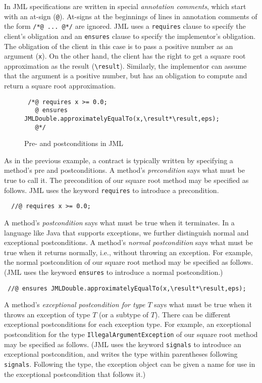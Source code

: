 \documentclass{jotarticle}
\begin{document}
In JML specifications are written in special \emph{annotation
comments\/}, which start with an at-sign (\texttt{@}).
At-signs at the beginnings of lines in annotation comments of the form
\texttt{/*@ ... @*/} are ignored.
JML uses a \texttt{requires} clause to specify the
client's obligation and an \texttt{ensures} clause to specify the
implementor's obligation.  The obligation of the client in this case is
to pass a positive number as an argument (\texttt{x}). On the other
hand, the client has the right to get a square root approximation as
the result ({\verb|\result|}). Similarly, the implementor can assume
that the argument is a positive number, but has an obligation to
compute and return a square root approximation.

\begin{figure}
\begin{verbatim}
 /*@ requires x >= 0.0;
   @ ensures JMLDouble.approximatelyEqualTo(x,\result*\result,eps);
   @*/
\end{verbatim}
\caption{Pre- and postconditions in JML}
\label{fig:prepost}
\end{figure}


As in the previous example,
a contract is typically written by specifying a method's pre and
postconditions.  A method's \emph{precondition} says what must be true
to call it. The precondition of our square root method may be
specified as follows. JML uses the keyword \texttt{requires} to introduce
a precondition.

\begin{verbatim}
  //@ requires x >= 0.0;
\end{verbatim}

A method's \emph{postcondition} says what must be true when it terminates.
In a language like Java that supports exceptions, we further
distinguish normal and exceptional postconditions.
A method's \emph{normal postcondition} says what must be true when it
returns normally, i.e., without throwing an exception. For example,
the normal postcondition of our square root method may be specified as
follows. (JML uses the keyword \texttt{ensures} to introduce a
normal postcondition.)

\begin{verbatim}
 //@ ensures JMLDouble.approximatelyEqualTo(x,\result*\result,eps);
\end{verbatim}

A method's \emph{exceptional postcondition for type $T$}
says what must be true when it throws an exception of type $T$ (or a
subtype of $T$). There can be different exceptional postconditions for
each exception type.
For example, an exceptional postcondition for the type
\texttt{IllegalArgumentException} of
our square root method may be specified as follows. (JML uses the
keyword \texttt{signals} to introduce an exceptional postcondition,
and writes the type within parentheses following
\texttt{signals}. Following the type, the exception object can be
given a name for use in the exceptional postcondition that follows it.)
\end{document}
